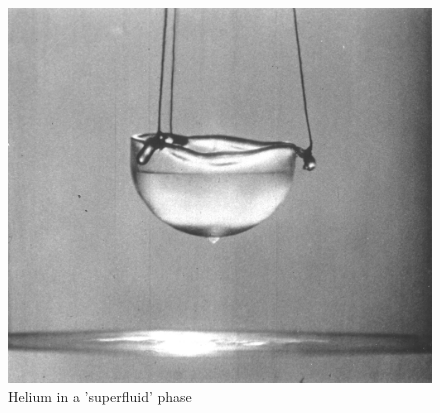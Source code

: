 \documentclass[11pt, oneside]{article}   	%
\begin{document}
\begin{figure}[h]
	\centering
	\includegraphics[scale=0.1]{Liquid_helium_Rollin_film.jpg}
	\caption{Helium in a 'superfluid' phase}
\end{figure}
\end{document}
